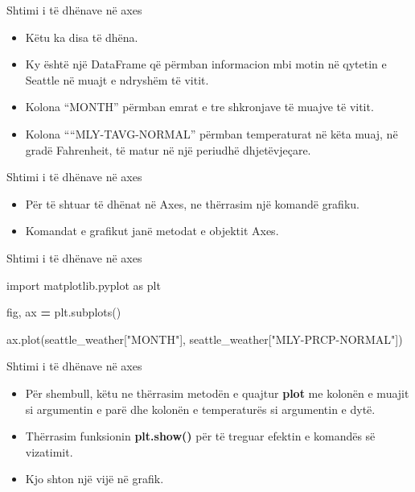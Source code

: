 \documentclass[
  ignorenonframetext,
]{beamer}
\newenvironment{Shaded}{\begin{snugshade}}{\end{snugshade}}
\newcommand{\ImportTok}[1]{#1}
\newcommand{\NormalTok}[1]{#1}
\newcommand{\OperatorTok}[1]{\textcolor[rgb]{0.81,0.36,0.00}{\textbf{#1}}}
\newcommand{\StringTok}[1]{\textcolor[rgb]{0.31,0.60,0.02}{#1}}
\begin{document}
\begin{frame}{Shtimi i të dhënave në axes}
\protect\hypertarget{shtimi-i-tuxeb-dhuxebnave-nuxeb-axes-1}{}
\begin{itemize}
\item
  Këtu ka disa të dhëna.
\item
  Ky është një DataFrame që përmban informacion mbi motin në qytetin e
  Seattle në muajt e ndryshëm të vitit.
\item
  Kolona ``MONTH'' përmban emrat e tre shkronjave të muajve të vitit.
\item
  Kolona ````MLY-TAVG-NORMAL'' përmban temperaturat në këta muaj, në
  gradë Fahrenheit, të matur në një periudhë dhjetëvjeçare.
\end{itemize}
\end{frame}

\begin{frame}{Shtimi i të dhënave në axes}
\protect\hypertarget{shtimi-i-tuxeb-dhuxebnave-nuxeb-axes-2}{}
\begin{itemize}
\item
  Për të shtuar të dhënat në Axes, ne thërrasim një komandë grafiku.
\item
  Komandat e grafikut janë metodat e objektit Axes.
\end{itemize}
\end{frame}

\begin{frame}[fragile]{Shtimi i të dhënave në axes}
\protect\hypertarget{shtimi-i-tuxeb-dhuxebnave-nuxeb-axes-3}{}

\begin{Shaded}
\begin{Highlighting}[]
\ImportTok{import}\NormalTok{ matplotlib.pyplot }\ImportTok{as}\NormalTok{ plt}

\NormalTok{fig, ax }\OperatorTok{=}\NormalTok{ plt.subplots()}

\NormalTok{ax.plot(seattle\_weather[}\StringTok{"MONTH"}\NormalTok{], seattle\_weather[}\StringTok{"MLY{-}PRCP{-}NORMAL"}\NormalTok{])}
\end{Highlighting}
\end{Shaded}
\end{frame}

\begin{frame}{Shtimi i të dhënave në axes}
\protect\hypertarget{shtimi-i-tuxeb-dhuxebnave-nuxeb-axes-4}{}
\begin{itemize}
\item
  Për shembull, këtu ne thërrasim metodën e quajtur \textbf{plot} me
  kolonën e muajit si argumentin e parë dhe kolonën e temperaturës si
  argumentin e dytë.
\item
  Thërrasim funksionin \textbf{plt.show()} për të treguar efektin e
  komandës së vizatimit.
\item
  Kjo shton një vijë në grafik.
\end{itemize}
\end{frame}
\end{document}

